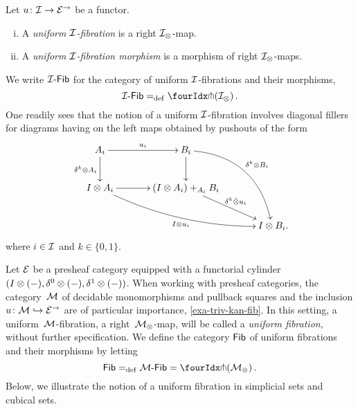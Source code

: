 \documentclass[reqno,10pt,a4paper,oneside,draft]{amsart}
\begin{document}
\begin{definition} \label{def:I-fibration}
Let $u \co \cal{I} \to \catE^\to$ be a functor.
\begin{enumerate}[(i)]
\item A \emph{uniform $\cal{I}$-fibration} is a right $\cal{I}_\otimes$-map.
\item A \emph{uniform $\cal{I}$-fibration morphism} is a morphism of right $\cal{I}_\otimes$-maps.
\end{enumerate}
\end{definition}

We write $\Fib[\cal{I}]$ for the category of uniform $\cal{I}$-fibrations and their morphisms, \ie
\[
  \Fib[\cal{I}] \defeq \liftr{(\cal{I}_\otimes)} \, .
\]
One readily sees that the notion of a uniform $\cal{I}$-fibration involves diagonal fillers for diagrams having on the left maps obtained by pushouts of the form
\begin{gather*}
\xymatrix@C=1.2cm{
  A_i
  \ar[r]^{u_i}
  \ar[d]_{\kcyl \otimes A_i}
&
  B_i
  \ar@/^2pc/[ddr]^{\kcyl \otimes B_i}
  \ar[d]
&\\
  \interval \otimes A_i
  \ar@/_1pc/[drr]_{\interval \otimes u_i}
  \ar[r]
&
  (\interval \otimes A_i) +_{A_i} B_i
  \ar[dr]^-{\delta^k \hatotimes u_i}
&\\&&
  \interval \otimes B_i
\rlap{.}}
\end{gather*}
where $i \in \cal{I}$ and $k \in \{0, 1 \}$.


\begin{example}
Let $\catE$ be a presheaf category equipped with a functorial cylinder $(\interval \otimes (-), \lcyl \otimes (-), \rcyl \otimes (-))$.
When working with presheaf categories, the category~$\cal{M}$ of decidable monomorphisms and pullback squares and the inclusion $u \co \cal{M} \hookrightarrow \catE^\to$ are of particular importance, \cf \cref{exa-triv-kan-fib}.
In this setting, a uniform~$\cal{M}$-fibration, \ie a right~$\cal{M}_\otimes$-map, will be called a \emph{uniform fibration}, without further specification.
We define the category $\Fib$ of uniform fibrations and their morphisms by letting
\[
  \Fib \defeq \Fib[\cal{M}] = \liftr{(\cal{M}_\otimes)} \, .
\]
Below, we illustrate the notion of a uniform fibration in simplicial sets and cubical sets.
\end{example}
\end{document}

